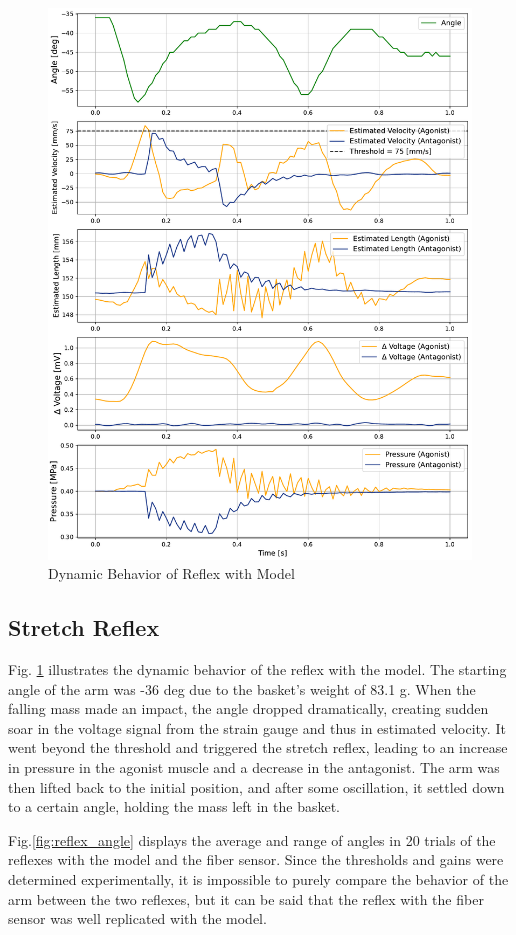 \begin{figure}[t]
\begin{minipage}[H]{\textwidth}
\begin{minipage}[H]{0.48\textwidth}
            \includegraphics[width=\columnwidth]{fig/20240819_r20_reflex_all_plt.pdf}
            \caption{Dynamic Behavior of Reflex with Model}
            \label{fig:reflex_all}
        \end{minipage}
    \end{minipage}
\end{figure}
\subsection{Stretch Reflex}
Fig. \ref{fig:reflex_all} illustrates the dynamic behavior of the reflex with the model. The starting angle of the arm was -36 deg due to the basket's weight of 83.1 g. When the falling mass made an impact, the angle dropped dramatically, creating sudden soar in the voltage signal from the strain gauge and thus in estimated velocity. It went beyond the threshold and triggered the stretch reflex, leading to an increase in pressure in the agonist muscle and a decrease in the antagonist. The arm was then lifted back to the initial position, and after some oscillation, it settled down to a certain angle, holding the mass left in the basket.

Fig.\ref{fig:reflex_angle} displays the average and range of angles in 20 trials of the reflexes with the model and the fiber sensor. Since the thresholds and gains were determined experimentally, it is impossible to purely compare the behavior of the arm between the two reflexes, but it can be said that the reflex with the fiber sensor was well replicated with the model.


